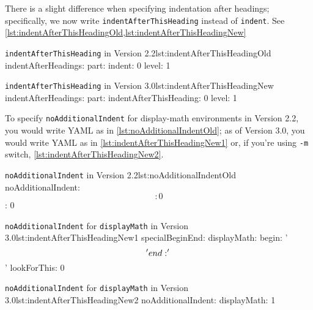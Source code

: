 	 There is a slight difference when specifying indentation after headings; specifically,
	 we now write \texttt{indentAfterThisHeading} instead of \texttt{indent}. See \cref{lst:indentAfterThisHeadingOld,lst:indentAfterThisHeadingNew}

	 \begin{minipage}{.45\textwidth}
		 \begin{yaml}[style=yaml-LST,numbers=none]{\texttt{indentAfterThisHeading} in Version 2.2}{lst:indentAfterThisHeadingOld}
indentAfterHeadings:
    part:
       indent: 0
       level: 1
\end{yaml}
	 \end{minipage}%
	 \hfill
	 \begin{minipage}{.45\textwidth}
		 \begin{yaml}[style=yaml-LST,numbers=none]{\texttt{indentAfterThisHeading} in Version 3.0}{lst:indentAfterThisHeadingNew}
indentAfterHeadings:
    part:
       indentAfterThisHeading: 0
       level: 1
\end{yaml}
	 \end{minipage}%

	 To specify \texttt{noAdditionalIndent} for display-math environments in Version 2.2, you would write YAML
	 as in \cref{lst:noAdditionalIndentOld}; as of Version 3.0, you would write YAML as in \cref{lst:indentAfterThisHeadingNew1}
	 or, if you're using \texttt{-m} switch, \cref{lst:indentAfterThisHeadingNew2}.

	 \begin{minipage}{.45\textwidth}
		 \begin{yaml}[style=yaml-LST,numbers=none]{\texttt{noAdditionalIndent} in Version 2.2}{lst:noAdditionalIndentOld}
noAdditionalIndent:
    \[: 0
    \]: 0
\end{yaml}
	 \end{minipage}%
	 \hfill
	 \begin{minipage}{.45\textwidth}
		 \begin{yaml}[style=yaml-LST,numbers=none]{\texttt{noAdditionalIndent} for \texttt{displayMath} in Version 3.0}{lst:indentAfterThisHeadingNew1}
specialBeginEnd:
    displayMath:
        begin: '\\\['
        end: '\\\]'
        lookForThis: 0
\end{yaml}

		 \begin{yaml}[style=yaml-LST,numbers=none]{\texttt{noAdditionalIndent} for \texttt{displayMath}  in Version 3.0}{lst:indentAfterThisHeadingNew2}
noAdditionalIndent:
    displayMath: 1
\end{yaml}
	 \end{minipage}%
